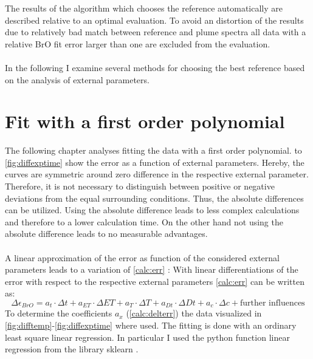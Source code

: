 \documentclass  [
  paper    = a4,
  BCOR     = 10mm,
  twoside,
  fontsize = 12pt,
  fleqn,
  toc      = bibnumbered,
  toc      = listofnumbered,
  numbers  = noendperiod,
  headings = normal,
  listof   = leveldown,
  version  = 3.03
]                                       {scrreprt}
\begin{document}
	The results of the algorithm which chooses the reference automatically are described relative to an optimal evaluation. To avoid an distortion of the results due to relatively bad match between reference and plume spectra all data with a relative BrO fit error larger than one are excluded from the evaluation.\\
	\\
	In the following I examine several methods for choosing the best reference based on the analysis of external parameters. 
	
\section{Fit with a first order polynomial}
	The following chapter analyses fitting the data with a first order polynomial.  to \cref{fig:diffexptime} show the   error as a function of external parameters. Hereby, the curves are symmetric around zero difference in the respective external parameter. Therefore, it is not necessary to distinguish between positive or negative deviations from the equal surrounding conditions. Thus, the absolute differences can be utilized. Using the absolute difference leads to less complex calculations and therefore to a lower calculation time. On the other hand not using the absolute difference leads to no measurable advantages. \\
	\\
	A linear approximation of the   error as function of the considered external parameters leads to a variation of  \cref{calc:err} :
	With linear differentiations of the   error with respect to the respective external parameters \cref{calc:err} can be written as:	
	\begin{equation}
		\Delta \epsilon_{BrO} = a_{t}\cdot\Delta t+a_{ET}\cdot\Delta ET+a_{T}\cdot\Delta T+a_{Dt}\cdot\Delta Dt +a_{c}\cdot\Delta c + \text{further influences}
		\label{calc:delterr}
	\end{equation}
	To determine the coefficients $a_{x}$ (\cref{calc:delterr}) the data visualized in \cref{fig:difftemp}-\ref{fig:diffexptime} where used.  The fitting is done with an ordinary least square linear regression. In particular I used the python function linear regression from the library sklearn \citep{SKlearn}. \\
	
\end{document}
